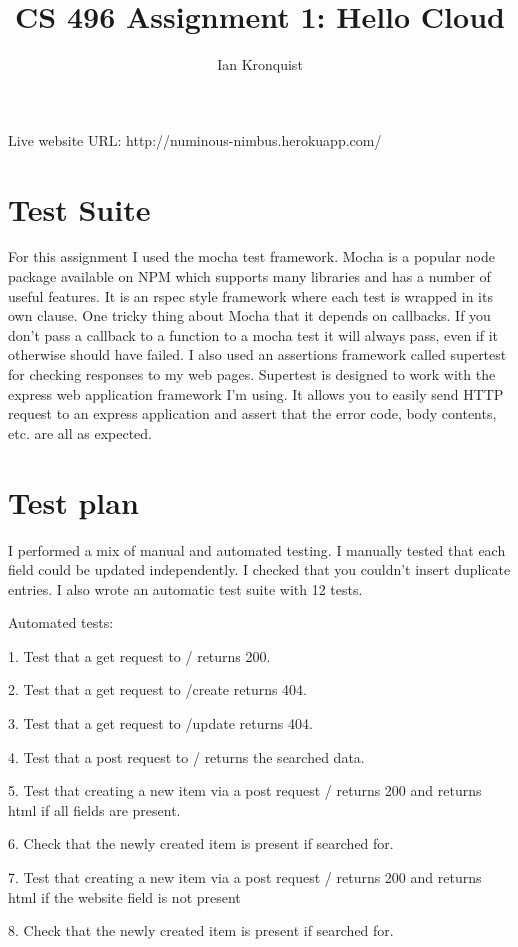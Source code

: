 \documentclass[12pt]{article}
\title{CS 496 Assignment 1: Hello Cloud}
\author{Ian Kronquist}
\begin{document}
\maketitle

Live website URL: http://numinous-nimbus.herokuapp.com/

\section{Test Suite}
For this assignment I used the mocha test framework. Mocha is a popular node package available on NPM which supports many libraries and has a number of useful features. It is an rspec style framework where each test is wrapped in its own clause. One tricky thing about Mocha that it depends on callbacks. If you don't pass a callback to a function to a mocha test it will always pass, even if it otherwise should have failed. I also used an assertions framework called supertest for checking responses to my web pages. Supertest is designed to work with the express web application framework I'm using. It allows you to easily send HTTP request to an express application and assert that the error code, body contents, etc. are all as expected.

\section{Test plan}
I performed a mix of manual and automated testing. I manually tested that each field could be updated independently. I checked that you couldn't insert duplicate entries. I also wrote an automatic test suite with 12 tests.

Automated tests:

1. Test that a get request to / returns 200.

2. Test that a get request to /create returns 404.

3. Test that a get request to /update returns 404.

4. Test that a post request to / returns the searched data.

5. Test that creating a new item via a post request / returns 200 and returns html if all fields are present.

6. Check that the newly created item is present if searched for.

7. Test that creating a new item via a post request / returns 200 and returns html if the website field is not present

8. Check that the newly created item is present if searched for.
\end{document}
